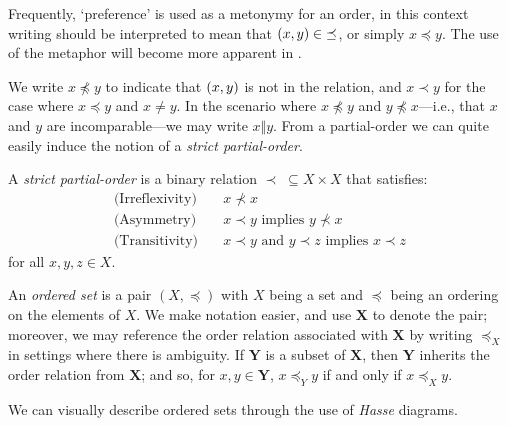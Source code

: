 Frequently, `preference' is used as a metonymy for an order, in this context writing  should be interpreted to mean that
$(x,y)\in \; \preceq$, or simply $x \preceq y$. The use of the metaphor will become more apparent in .

We write $x \npreceq y$ to indicate that $(x,y)$ is not in the relation, and $x \prec y$ for the case where $x\preceq y$ and $x \not = y$. In the scenario where
$x \not \preceq y$ and $y \not \preceq x$---i.e., that $x$ and $y$ are incomparable---we may write $x \Vert y$. From a partial-order we can quite easily induce the notion of a \emph{strict
partial-order}.

\begin{definition}
  \label{definition:strict-partial-order} A \textit{strict partial-order}  is a binary relation $\prec \; \subseteq X \times X$ that
  satisfies:
  \begin{align}
    \text{(Irreflexivity)}\quad & x \nprec x                                                \\
    \text{(Asymmetry)}\quad     & x \prec y \text{ implies }y \nprec x                      \\
    \text{(Transitivity)}\quad  & x \prec y \text{ and }y \prec z \text{ implies }x \prec z
  \end{align}
  for all $x,y,z \in X$.
\end{definition}

An \textit{ordered set} is a pair $(X, \preceq)$ with $X$ being a set and $\preceq$ being an ordering on the elements of $X$. We make notation easier, and use $\mathbf{X}$ to
denote the pair; moreover, we may reference the order relation associated with $\mathbf{X}$ by writing $\preceq_{X}$ in settings where there is ambiguity. If $\mathbf{Y}$ is a subset
of $\mathbf{X}$, then $\mathbf{Y}$ inherits the order relation from $\mathbf{X}$; and so, for $x,y \in \mathbf{Y}$, $x \preceq_{Y}y$ if and only if $x \preceq_{X}y$.

We can visually describe ordered sets through the use of \textit{Hasse} diagrams.

